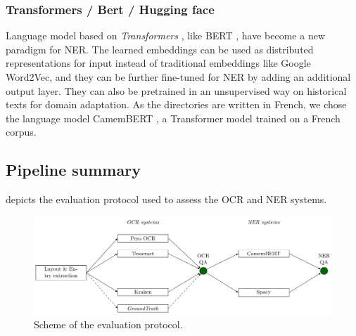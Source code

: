 \subsubsection{Transformers / Bert / Hugging face}
Language model based on \textit{Transformers} \cite{vaswani2017attention}, like BERT \cite{devlin2018bert}, have become a new paradigm for NER\cite{li2020}. 
The learned embeddings can be used as distributed representations for input instead of traditional embeddings like Google Word2Vec, and they can be further fine-tuned for NER by adding an additional output layer. 
They can also be pretrained in an unsupervised way on historical texts for domain adaptation.
As the directories are written in French, we chose the language model CamemBERT \cite{martin-etal-2020-camembert}, a Transformer model trained on a French corpus.

\subsection{Pipeline summary}

 depicts the evaluation protocol used to assess the OCR and NER systems. 

\begin{figure}[tb]
    \includegraphics[width=\linewidth]{figs/protocol.pdf}
    \caption{Scheme of the evaluation protocol. }
    \label{fig.protocol}
    \end{figure}


